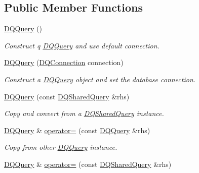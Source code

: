 \subsection*{Public Member Functions}
\begin{DoxyCompactItemize}
\item 
\hypertarget{classDQQuery_ab4e826cbfc7c9f97298db3cec73cda7a}{
\hyperlink{classDQQuery_ab4e826cbfc7c9f97298db3cec73cda7a}{DQQuery} ()}
\label{classDQQuery_ab4e826cbfc7c9f97298db3cec73cda7a}

\begin{DoxyCompactList}\small\item\em Construct q \hyperlink{classDQQuery}{DQQuery} and use default connection. \item\end{DoxyCompactList}\item 
\hypertarget{classDQQuery_ad482bf97ac04b7f0e18a5935458d2f78}{
\hyperlink{classDQQuery_ad482bf97ac04b7f0e18a5935458d2f78}{DQQuery} (\hyperlink{classDQConnection}{DQConnection} connection)}
\label{classDQQuery_ad482bf97ac04b7f0e18a5935458d2f78}

\begin{DoxyCompactList}\small\item\em Construct a \hyperlink{classDQQuery}{DQQuery} object and set the database connection. \item\end{DoxyCompactList}\item 
\hypertarget{classDQQuery_ae0619c8a4591c283c43292ed2cada624}{
\hyperlink{classDQQuery_ae0619c8a4591c283c43292ed2cada624}{DQQuery} (const \hyperlink{classDQSharedQuery}{DQSharedQuery} \&rhs)}
\label{classDQQuery_ae0619c8a4591c283c43292ed2cada624}

\begin{DoxyCompactList}\small\item\em Copy and convert from a \hyperlink{classDQSharedQuery}{DQSharedQuery} instance. \item\end{DoxyCompactList}\item 
\hypertarget{classDQQuery_a2e98e4b56549ea22b28513223eeb2815}{
\hyperlink{classDQQuery}{DQQuery} \& \hyperlink{classDQQuery_a2e98e4b56549ea22b28513223eeb2815}{operator=} (const \hyperlink{classDQQuery}{DQQuery} \&rhs)}
\label{classDQQuery_a2e98e4b56549ea22b28513223eeb2815}

\begin{DoxyCompactList}\small\item\em Copy from other \hyperlink{classDQQuery}{DQQuery} instance. \item\end{DoxyCompactList}\item 
\hypertarget{classDQQuery_abd9bc6a6467ee3ddbb00ebdac66ed1ec}{
\hyperlink{classDQQuery}{DQQuery} \& \hyperlink{classDQQuery_abd9bc6a6467ee3ddbb00ebdac66ed1ec}{operator=} (const \hyperlink{classDQSharedQuery}{DQSharedQuery} \&rhs)}
\label{classDQQuery_abd9bc6a6467ee3ddbb00ebdac66ed1ec}


\end{DoxyCompactItemize}
